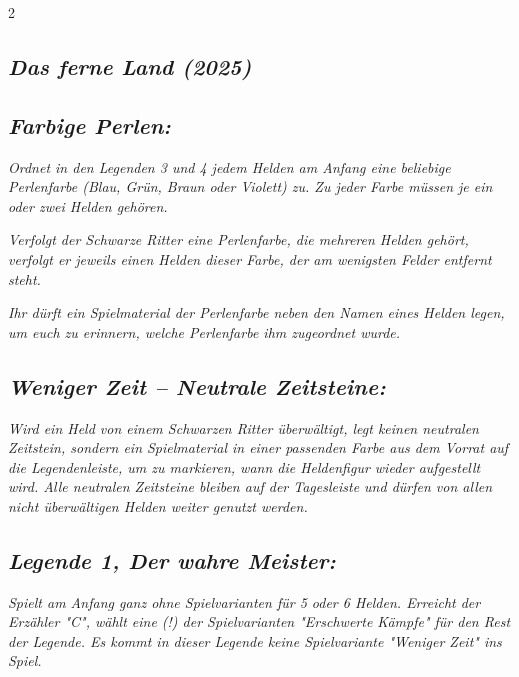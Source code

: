 \documentclass[10pt, a4paper, oneside]{book}
\newcommand{\fan}[1]{\textit{#1}}
\begin{document}
\begin{multicols*}{2}
\begin{bgcolor}
\section{\fan{Das ferne Land (2025)}}




\subsection{\fan{Farbige Perlen:}}

\fan{Ordnet in den Legenden 3 und 4 jedem Helden am Anfang eine beliebige Perlenfarbe (Blau, Grün, Braun oder Violett) zu. Zu jeder Farbe müssen je ein oder zwei Helden gehören.}

\fan{Verfolgt der Schwarze Ritter eine Perlenfarbe, die mehreren Helden gehört, verfolgt er jeweils einen Helden dieser Farbe, der am wenigsten Felder entfernt steht.}

\fan{Ihr dürft ein Spielmaterial der Perlenfarbe neben den Namen eines Helden legen, um euch zu erinnern, welche Perlenfarbe ihm zugeordnet wurde.}



\subsection{\fan{Weniger Zeit – Neutrale Zeitsteine:}}

\fan{Wird ein Held von einem Schwarzen Ritter überwältigt, legt keinen neutralen Zeitstein, sondern ein Spielmaterial in einer passenden Farbe aus dem Vorrat auf die Legendenleiste, um zu markieren, wann die Heldenfigur wieder aufgestellt wird. Alle neutralen Zeitsteine bleiben auf der Tagesleiste und dürfen von allen nicht überwältigen Helden weiter genutzt werden.}


\subsection{\fan{Legende 1, Der wahre Meister:}}


\fan{Spielt am Anfang ganz ohne Spielvarianten für 5 oder 6 Helden. Erreicht der Erzähler "C", wählt eine (!) der Spielvarianten "Erschwerte Kämpfe" für den Rest der Legende. Es kommt in dieser Legende keine Spielvariante "Weniger Zeit" ins Spiel.}

\end{bgcolor}





\end{multicols*}
\end{document}
